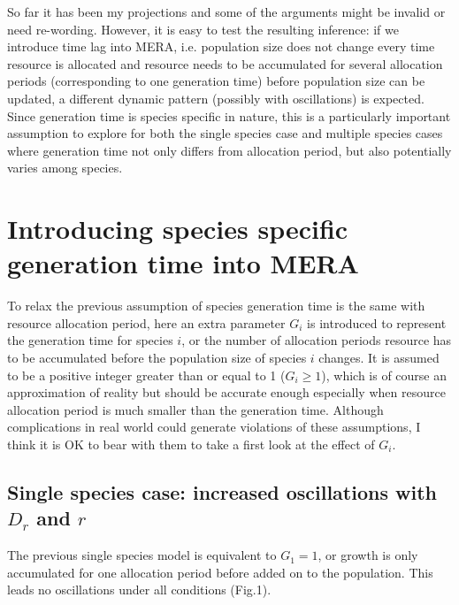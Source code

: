 \documentclass[12pt]{article}
\begin{document}
So far it has been my projections and some of the arguments might be invalid or need re-wording. However, it is easy to test the resulting inference: if we introduce time lag into MERA, i.e. population size does not change every time resource is allocated and resource needs to be accumulated for several allocation periods (corresponding to one generation time) before population size can be updated, a different dynamic pattern (possibly with oscillations) is expected. Since generation time is species specific in nature, this is a particularly important assumption to explore for both the single species case and multiple species cases where generation time not only differs from allocation period, but also potentially varies among species.

\section{Introducing species specific generation time into MERA}

To relax the previous assumption of species generation time is the same with resource allocation period, here an extra parameter $G_i$ is introduced to represent the generation time for species $i$, or the number of allocation periods resource has to be accumulated before the population size of species $i$ changes. It is assumed to be a positive integer greater than or equal to 1 ($G_i \geq 1$), which is of course an approximation of reality but should be accurate enough especially when resource allocation period is much smaller than the generation time. Although complications in real world could generate violations of these assumptions, I think it is OK to bear with them to take a first look at the effect of $G_i$.

\subsection{Single species case: increased oscillations with $D_r$ and $r$}

The previous single species model is equivalent to $G_1=1$, or growth is only accumulated for one allocation period before added on to the population. This leads no oscillations under all conditions (Fig.1).
\end{document}
